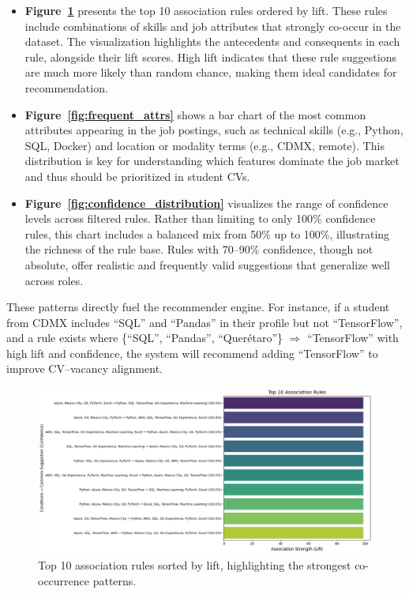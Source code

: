 \documentclass[runningheads]{llncs}
\begin{document}
	\begin{itemize}
		\item \textbf{Figure~\ref{fig:top_rules}} presents the top 10 association rules ordered by lift. These rules include combinations of skills and job attributes that strongly co-occur in the dataset. The visualization highlights the antecedents and consequents in each rule, alongside their lift scores. High lift indicates that these rule suggestions are much more likely than random chance, making them ideal candidates for recommendation.
		
		\item \textbf{Figure~\ref{fig:frequent_attrs}} shows a bar chart of the most common attributes appearing in the job postings, such as technical skills (e.g., Python, SQL, Docker) and location or modality terms (e.g., CDMX, remote). This distribution is key for understanding which features dominate the job market and thus should be prioritized in student CVs.
		
		\item \textbf{Figure~\ref{fig:confidence_distribution}} visualizes the range of confidence levels across filtered rules. Rather than limiting to only 100\% confidence rules, this chart includes a balanced mix from 50\% up to 100\%, illustrating the richness of the rule base. Rules with 70–90\% confidence, though not absolute, offer realistic and frequently valid suggestions that generalize well across roles.
	\end{itemize}
	These patterns directly fuel the recommender engine. For instance, if a student from CDMX includes “SQL” and “Pandas” in their profile but not “TensorFlow”, and a rule exists where \{“SQL”, “Pandas”, “Querétaro”\} $\Rightarrow$ “TensorFlow” with high lift and confidence, the system will recommend adding “TensorFlow” to improve CV–vacancy alignment.
	
	\begin{figure}[H]
		\centering
		\includegraphics[width=0.835\linewidth]{imagenes/top_rules.png}
		\caption{Top 10 association rules sorted by lift, highlighting the strongest co-occurrence patterns.}
		\label{fig:top_rules}
	\end{figure}
	
\end{document}
